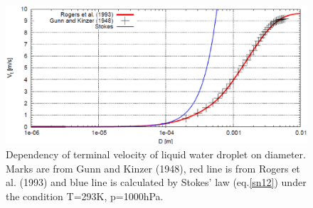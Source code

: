 \begin{table}[h]
\begin{center}
\caption{Branch points of the weighted terminal velocity.}
\label{table_sn13-2-10}
\end{center}
\end{table}

\begin{figure}[]
\begin{center}
\includegraphics[scale=0.3]{./figure/D_vt_sn13.eps}
\end{center}
\caption{Dependency of terminal velocity of liquid water droplet on diameter. Marks are from Gunn and Kinzer (1948), red line is from Rogers et al. (1993) and blue line is calculated by Stokes’ law (eq.\ref{sn12}) under the condition T=293K, p=1000hPa.}
\label{figsn2-11}
\end{figure}

